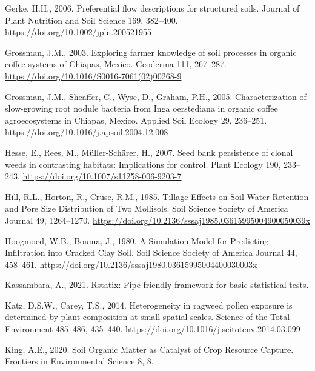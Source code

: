 \documentclass[
  12pt,
]{article}
\newlength{\cslhangindent}
\newlength{\cslentryspacingunit} %
\newenvironment{CSLReferences}[2] %
 {%
  \setlength{\parindent}{0pt}
  \ifodd #1
  \let\oldpar\par
  \def\par{\hangindent=\cslhangindent\oldpar}
  \fi
  \setlength{\parskip}{#2\cslentryspacingunit}
 }%
 {}
\begin{document}
\begin{CSLReferences}{1}{0}
\leavevmode{}%
Gerke, H.H., 2006. Preferential flow descriptions for structured soils. Journal of Plant Nutrition and Soil Science 169, 382--400. \url{https://doi.org/10.1002/jpln.200521955}

\leavevmode{}%
Grossman, J.M., 2003. Exploring farmer knowledge of soil processes in organic coffee systems of {Chiapas}, {Mexico}. Geoderma 111, 267--287. \url{https://doi.org/10.1016/S0016-7061(02)00268-9}

\leavevmode{}%
Grossman, J.M., Sheaffer, C., Wyse, D., Graham, P.H., 2005. Characterization of slow-growing root nodule bacteria from {Inga} oerstediana in organic coffee agroecosystems in {Chiapas}, {Mexico}. Applied Soil Ecology 29, 236--251. \url{https://doi.org/10.1016/j.apsoil.2004.12.008}

\leavevmode{}%
Hesse, E., Rees, M., Müller-Schärer, H., 2007. Seed bank persistence of clonal weeds in contrasting habitats: Implications for control. Plant Ecology 190, 233--243. \url{https://doi.org/10.1007/s11258-006-9203-7}

\leavevmode{}%
Hill, R.L., Horton, R., Cruse, R.M., 1985. Tillage {Effects} on {Soil Water Retention} and {Pore Size Distribution} of {Two Mollisols}. Soil Science Society of America Journal 49, 1264--1270. \url{https://doi.org/10.2136/sssaj1985.03615995004900050039x}

\leavevmode{}%
Hoogmoed, W.B., Bouma, J., 1980. A {Simulation Model} for {Predicting Infiltration} into {Cracked Clay Soil}. Soil Science Society of America Journal 44, 458--461. \url{https://doi.org/10.2136/sssaj1980.03615995004400030003x}

\leavevmode{}%
Kassambara, A., 2021. \href{https://CRAN.R-project.org/package=rstatix}{Rstatix: Pipe-friendly framework for basic statistical tests}.

\leavevmode{}%
Katz, D.S.W., Carey, T.S., 2014. Heterogeneity in ragweed pollen exposure is determined by plant composition at small spatial scales. Science of the Total Environment 485--486, 435--440. \url{https://doi.org/10.1016/j.scitotenv.2014.03.099}

\leavevmode{}%
King, A.E., 2020. Soil {Organic Matter} as {Catalyst} of {Crop Resource Capture}. Frontiers in Environmental Science 8, 8.


\end{CSLReferences}
\end{document}
